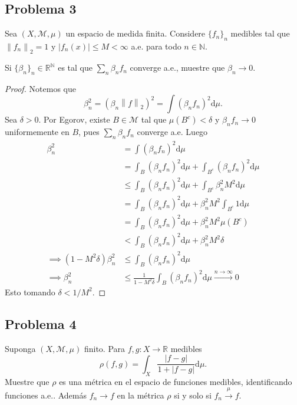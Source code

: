 \documentclass{article}
\theoremstyle{definition}
\theoremstyle{remark}
\numberwithin{equation}{section}
\newcommand{\M}{\mathcal{M}}
\newcommand{\N}{\mathbb{N}}
\newcommand{\R}{\mathbb{R}}
\renewcommand{\b}{\beta}
\renewcommand{\d}{\mathrm{d}}
\newcommand{\oo}{\infty}
\newcommand{\abs}[1]{\left| #1 \right|}
\newcommand{\norm}[1]{\left\lVert #1 \right\rVert}
\begin{document}
\newpage
\subsection{Problema 3}
Sea $(X,\M,\mu)$ un espacio de medida finita. Considere $\{f_n\}_n$ medibles tal que $\norm{f_n}_2 = 1$ y $\abs{f_n(x)} \leq M < \oo$ a.e. para todo $n \in \N$.

Si $\{\b_n\}_n \in \R^\N$ es tal que $\sum_n \b_n f_n$ converge a.e., muestre que $\b_n \to 0$.

\begin{proof}
  Notemos que 
  \[ \b_n^2 = (\b_n \norm{f}_2)^2 = \int (\b_n f_n)^2 \d\mu. \]
  Sea $\delta > 0$. Por Egorov, existe $B \in \M$ tal que $\mu(B^c) < \delta$ y $\b_n f_n \to 0$ uniformemente en $B$, pues $\sum_n \b_n f_n$ converge a.e. Luego 
  \begin{align*}
      \b_n^2 &= \int (\b_n f_n)^2 \d\mu \\
      &= \int_B (\b_n f_n)^2 \d\mu + \int_{B^c} (\b_n f_n)^2 \d\mu \\
      &\leq \int_B (\b_n f_n)^2 \d\mu + \int_{B^c} \b_n^2 M^2 \d\mu \\
      &= \int_B (\b_n f_n)^2 \d\mu + \b_n^2 M^2 \int_{B^c} 1 \d\mu \\
      &= \int_B (\b_n f_n)^2 \d\mu + \b_n^2 M^2 \mu(B^c) \\
      &< \int_B (\b_n f_n)^2 \d\mu + \b_n^2 M^2 \delta \\
      \implies (1-M^2\delta)\b_n^2 &\leq \int_B (\b_n f_n)^2 \d\mu \\
      \implies \b_n^2 &\leq \frac{1}{1-M^2\delta} \int_B (\b_n f_n)^2 \d\mu \xrightarrow{n\to\oo} 0
  \end{align*}
  Esto tomando $\delta < 1/M^2$.
\end{proof}

\newpage
\subsection{Problema 4}

Suponga $(X,\M,\mu)$ finito. Para $f,g \colon X \to \R$ medibles 
\[ \rho(f,g) = \int_X \frac{\abs{f-g}}{1 + \abs{f-g}} \d\mu. \]
Muestre que $\rho$ es una métrica en el espacio de funciones medibles, identificando funciones a.e.. Además $f_n \to f$ en la métrica $\rho$ si y solo si $f_n \xrightarrow{\mu} f$.
\end{document}
